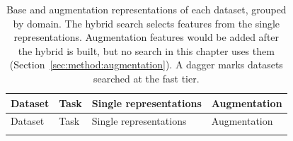 {\footnotesize
\begin{longtable}{P{2.7cm}P{2.7cm}P{4.6cm}P{3.1cm}}
\caption[Base and augmentation representations per dataset.]{Base and augmentation representations of each dataset, grouped by domain. The hybrid search selects features from the single representations. Augmentation features would be added after the hybrid is built, but no search in this chapter uses them (Section~\ref{sec:method:augmentation}). A dagger marks datasets searched at the fast tier.}\label{tab:dataset_reps}\\
\toprule
Dataset & Task & Single representations & Augmentation \\
\midrule
\endfirsthead
\toprule
Dataset & Task & Single representations & Augmentation \\
\midrule
\endhead
\bottomrule
\endfoot


\end{longtable}}
